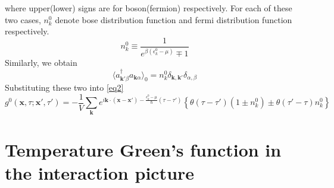 where upper(lower) signs are for boson(fermion) respectively.
For each of these two cases, $n_{k}^{0}$ denote bose distribution function and fermi distribution function respectively.
$$
n_{k}^{0}\equiv\frac{1}{e^{\beta(\epsilon_{k}^{0}-\mu)}\mp1}
$$
Similarly, we obtain
\[
\langle a_{\mathbf{k'}\beta}^{\dagger} a_{\mathbf{k}\alpha} \rangle_{0}=n_{k}^{0}\delta_{\mathbf{k},\mathbf{k'}}\delta_{\alpha,\beta} \tag{$4.1.24^\prime$}
\]
Substituting these two into \ref{eq2}
\begin{equation}\label{4.1.C}
g^{0}(\mathbf{x},\tau;\mathbf{x'},\tau')=-\frac{1}{V}\sum_{\mathbf{k}}e^{i\mathbf{k}\cdotp(\mathbf{x}-\mathbf{x'})-\frac{\epsilon_{k}^{0}-\mu}{\hbar}(\tau-\tau')}
\left\{\theta(\tau-\tau')(1\pm n_{k}^{0})\pm\theta(\tau'-\tau)n_{k}^{0}\right\}
\end{equation}


\section{Temperature Green's function in the interaction picture}

